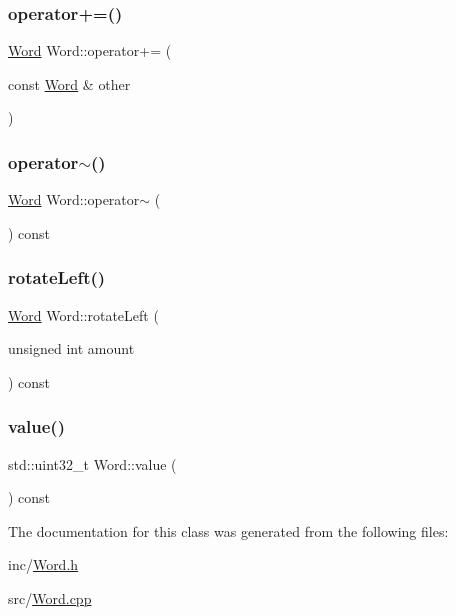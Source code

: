 \subsubsection{\texorpdfstring{operator+=()}{operator+=()}}
{\footnotesize\ttfamily \mbox{\hyperlink{class_word}{Word}} Word\+::operator+= (\begin{DoxyParamCaption}\item[{const \mbox{\hyperlink{class_word}{Word}} \&}]{other }\end{DoxyParamCaption})}

\mbox{\label{class_word_a666c7f1d06039b316b5ec48e905940e7}} 
\subsubsection{\texorpdfstring{operator$\sim$()}{operator~()}}
{\footnotesize\ttfamily \mbox{\hyperlink{class_word}{Word}} Word\+::operator$\sim$ (\begin{DoxyParamCaption}{ }\end{DoxyParamCaption}) const}

\mbox{\label{class_word_a8c4e85acb8c89c533086b56bfd31744e}} 
\subsubsection{\texorpdfstring{rotate\+Left()}{rotateLeft()}}
{\footnotesize\ttfamily \mbox{\hyperlink{class_word}{Word}} Word\+::rotate\+Left (\begin{DoxyParamCaption}\item[{unsigned int}]{amount }\end{DoxyParamCaption}) const}

\mbox{\label{class_word_a63a87cf461ab9d89ca0aba2e0800a9f2}} 
\subsubsection{\texorpdfstring{value()}{value()}}
{\footnotesize\ttfamily std\+::uint32\+\_\+t Word\+::value (\begin{DoxyParamCaption}{ }\end{DoxyParamCaption}) const}



The documentation for this class was generated from the following files\+:\begin{DoxyCompactItemize}
\item 
inc/\mbox{\hyperlink{_word_8h}{Word.\+h}}\item 
src/\mbox{\hyperlink{_word_8cpp}{Word.\+cpp}}\end{DoxyCompactItemize}
